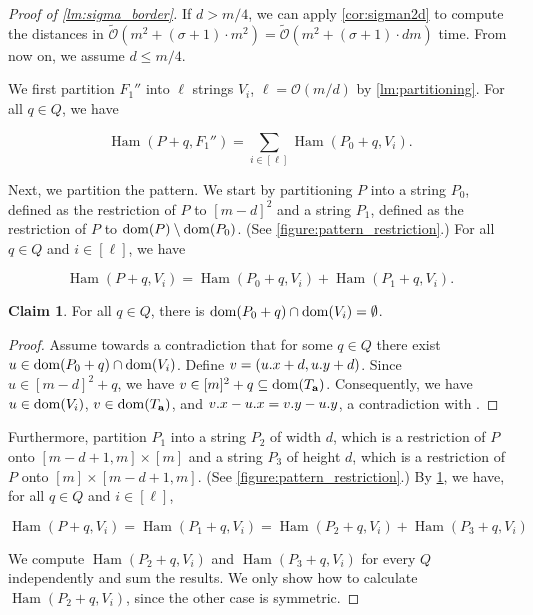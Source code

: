 \documentclass[11pt, letterpaper]{article}
\theoremstyle{plain}
\theoremstyle{definition}
\newtheorem{claim}{Claim}
\theoremstyle{remark}
\renewcommand{\O}{\mathcal{O}}
\newcommand{\tO}{\tilde{\mathcal{O}}}
\DeclareMathOperator*{\Ham}{Ham}
\begin{document}
\begin{proof}[{Proof of \cref{lm:sigma_border}}]
If $d > m/4$, we can apply \cref{cor:sigman2d} to compute the distances in $\tO(m^2 + (\sigma+1) \cdot m^2) = \tO(m^2 + (\sigma+1) \cdot dm)$ time. From now on, we assume $d \le m / 4$. 

We first partition $F_1''$ into $\ell$ strings $V_i$, $\ell = \O(m/d)$ by \ref{lm:partitioning}. For all $q \in Q$, we have 

\[ \Ham(P + q, F_1'') = \sum_{i \in [\ell]} \Ham(P_0 + q, V_i).\]

Next, we partition the pattern. We start by partitioning $P$ into a string $P_0$, defined as the restriction of $P$ to $[m - d]^2$ and a string $P_1$, defined as the restriction of $P$ to $\operatorname*{dom}(P) \setminus \operatorname*{dom}(P_0)$. (See \cref{figure:pattern_restriction}.) For all $q \in Q$ and $i \in [\ell]$, we have

\[ \Ham(P + q, V_i) = \Ham(P_0 + q, V_i) + \Ham(P_1 + q, V_i).\]

\begin{claim}\label{border_hamming_reduction}
For all $q \in Q$, there is $\operatorname*{dom}(P_0 + q) \cap \operatorname*{dom}(V_i) = \emptyset$.
\end{claim}
\begin{proof}
Assume towards a contradiction that for some $q \in Q$ there exist $u \in \operatorname*{dom}(P_0 + q) \cap \operatorname*{dom}(V_i)$. Define $v = (u.x + d, u.y + d)$. Since $u \in [m - d]^2 + q$, we have $v \in [m]^2 + q \subseteq \operatorname*{dom}(T_\mathbf{a})$. Consequently, we have $u \in \operatorname*{dom}(V_i)$, $v \in \operatorname*{dom}(T_\mathbf{a})$, and $v.x - u.x = v.y - u.y$, a contradiction with .
\end{proof}

Furthermore, partition $P_1$ into a string $P_2$ of width $d$, which is a restriction of $P$ onto $[m-d+1,m]\times [m]$ and a string $P_3$ of height $d$,  which is a restriction of $P$ onto $[m] \times [m-d+1,m]$. (See \cref{figure:pattern_restriction}.) By \cref{border_hamming_reduction}, we have, for all $q \in Q$ and $i \in [\ell]$, 

\[\Ham(P + q, V_i) = \Ham(P_1 + q, V_i) = \Ham(P_2 + q, V_i) + \Ham(P_3 + q, V_i) \]

We compute $\Ham(P_2 + q, V_i)$ and $\Ham(P_3 + q, V_i)$ for every $Q$ independently and sum the results. We only show how to calculate $\Ham(P_2 + q, V_i)$, since the other case is symmetric. 


\end{proof}
\end{document}
